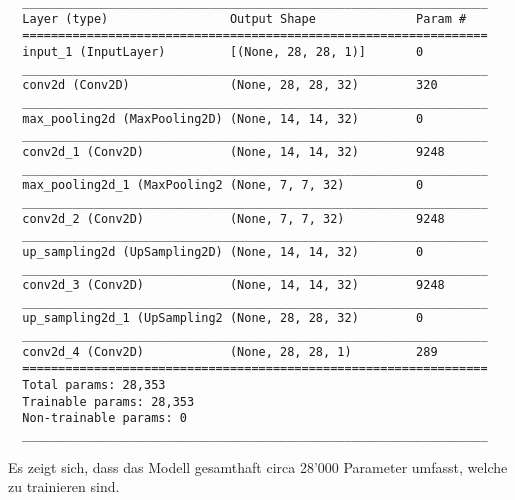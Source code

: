 \begin{verbatim}
  _________________________________________________________________
  Layer (type)                 Output Shape              Param #
  =================================================================
  input_1 (InputLayer)         [(None, 28, 28, 1)]       0
  _________________________________________________________________
  conv2d (Conv2D)              (None, 28, 28, 32)        320
  _________________________________________________________________
  max_pooling2d (MaxPooling2D) (None, 14, 14, 32)        0
  _________________________________________________________________
  conv2d_1 (Conv2D)            (None, 14, 14, 32)        9248
  _________________________________________________________________
  max_pooling2d_1 (MaxPooling2 (None, 7, 7, 32)          0
  _________________________________________________________________
  conv2d_2 (Conv2D)            (None, 7, 7, 32)          9248
  _________________________________________________________________
  up_sampling2d (UpSampling2D) (None, 14, 14, 32)        0
  _________________________________________________________________
  conv2d_3 (Conv2D)            (None, 14, 14, 32)        9248
  _________________________________________________________________
  up_sampling2d_1 (UpSampling2 (None, 28, 28, 32)        0
  _________________________________________________________________
  conv2d_4 (Conv2D)            (None, 28, 28, 1)         289
  =================================================================
  Total params: 28,353
  Trainable params: 28,353
  Non-trainable params: 0
  _________________________________________________________________
\end{verbatim}
Es zeigt sich, dass das Modell gesamthaft circa 28'000 Parameter umfasst,
welche zu trainieren sind.

